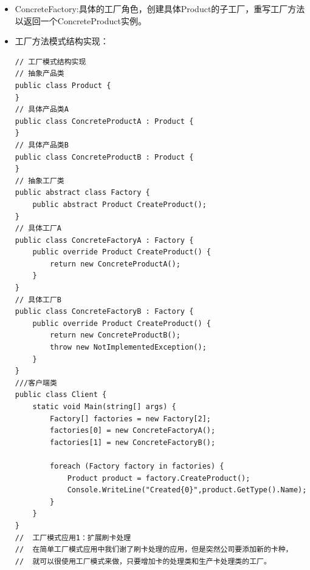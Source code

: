 \documentclass[9pt, b5paper]{article}
\begin{document}
\begin{itemize}
\item ConcreteFactory:具体的工厂角色，创建具体Product的子工厂，重写工厂方法以返回一个ConcreteProduct实例。
\item 工厂方法模式结构实现：
\begin{verbatim}
// 工厂模式结构实现
// 抽象产品类
public class Product {
}
// 具体产品类A
public class ConcreteProductA : Product {
}
// 具体产品类B
public class ConcreteProductB : Product {
}
// 抽象工厂类
public abstract class Factory {
    public abstract Product CreateProduct();
}
// 具体工厂A
public class ConcreteFactoryA : Factory {
    public override Product CreateProduct() {
        return new ConcreteProductA();
    }
}
// 具体工厂B
public class ConcreteFactoryB : Factory {
    public override Product CreateProduct() {
        return new ConcreteProductB();
        throw new NotImplementedException();
    }
}
///客户端类
public class Client {
    static void Main(string[] args) {
        Factory[] factories = new Factory[2];
        factories[0] = new ConcreteFactoryA();
        factories[1] = new ConcreteFactoryB();

        foreach (Factory factory in factories) {
            Product product = factory.CreateProduct();
            Console.WriteLine("Created{0}",product.GetType().Name);
        }
    }
}
//  工厂模式应用1：扩展刷卡处理
//  在简单工厂模式应用中我们谢了刷卡处理的应用，但是突然公司要添加新的卡种，
//  就可以很使用工厂模式来做，只要增加卡的处理类和生产卡处理类的工厂。
    

\end{verbatim}
\end{itemize}
\end{document}
